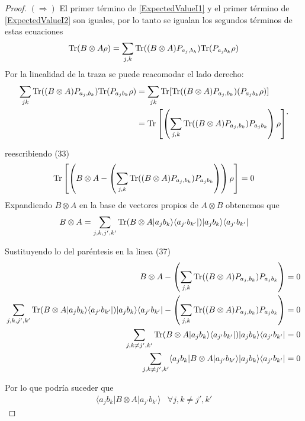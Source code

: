 \documentclass[12pt,oneside]{book}\raggedbottom{}
\begin{document}
\begin{proof}
	$(\Rightarrow)$
El primer término de {\ref{ExpectedValueI1}} y el primer término de {\ref{ExpectedValueI2}} son iguales, por lo tanto se igualan los segundos términos
 de estas ecuaciones \[{\rm Tr}(B\otimes A \rho)=\sum_{j,k}{\rm Tr}((B\otimes A) P_{a_j,b_k}){\rm Tr}(P_{a_j b_k}\rho )\] Por la linealidad de la traza se puede reacomodar el lado derecho: \[\begin{split}\sum_{jk}{\rm Tr}((B\otimes A) P_{a_j,b_k}){\rm Tr}(P_{a_j b_k}\rho )&= \sum_{jk}{\rm Tr}[{\rm Tr}((B\otimes A) P_{a_j,b_k})(P_{a_j b_k}\rho )]\\&={\rm Tr}\left[\left(\sum_{j,k}{\rm Tr}((B\otimes A) P_{a_j,b_k})P_{a_j b_k}\right)\rho \right]\end{split}.\]  

reescribiendo (33)
\[{\rm Tr}\left[\left(B\otimes A-\left(\sum_{j,k}{\rm Tr}((B\otimes A) P_{a_j,b_k})P_{a_j b_k}\right)\right)\rho \right]=0\]
Expandiendo $B\otimes A$ en la base de vectores propios de $A\otimes B$ obtenemos que \[B\otimes A=\sum_{j,k,j',k'}{\rm Tr}(B\otimes A |a_j b_k\rangle \langle a_{j'}b_{k'}|)|a_j b_k\rangle \langle a_{j'}b_{k'}|\]

Sustituyendo lo del paréntesis en la linea (37)
\[\begin{split}
	B\otimes A-\left(\sum_{j,k}{\rm Tr}((B\otimes A) P_{a_j,b_k})P_{a_j b_k}\right)&=0\\
\sum_{j,k,j',k'}{\rm Tr}(B\otimes A |a_j b_k\rangle \langle a_{j'}b_{k'}|)|a_j b_k\rangle \langle a_{j'}b_{k'}|-\left(\sum_{j,k}{\rm Tr}((B\otimes A) P_{a_j,b_k})P_{a_j b_k}\right)&=0\\
\sum_{j,k\ne j',k'}{\rm Tr}(B\otimes A |a_j b_k\rangle \langle a_{j'}b_{k'}|)|a_j b_k\rangle \langle a_{j'}b_{k'}|&=0\\
\sum_{j,k\ne j',k'}  \langle a_j b_k |B\otimes A|a_{j'}b_{k'}\rangle |a_j b_k\rangle \langle a_{j'}b_{k'}|&=0\\
\end{split}\]

Por lo que podría suceder que \[\begin{array}{cc}
	\langle a_j b_k |B\otimes A|a_{j'}b_{k'}\rangle& \forall j,k\ne j',k'\end{array}\]






\end{proof}
\end{document}
